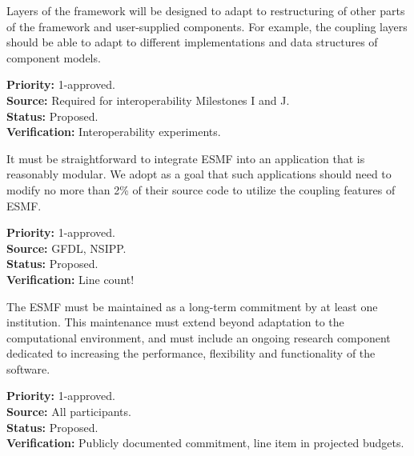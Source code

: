 Layers of the framework will be designed to adapt to restructuring of
other parts of the framework and user-supplied components.  For
example, the coupling layers should be able to adapt to different
implementations and data structures of component models.
\begin{reqlist}
{\bf Priority:} 1-approved. \\
{\bf Source:} Required for interoperability Milestones I and J. \\
{\bf Status:} Proposed. \\
{\bf Verification:} Interoperability experiments.
\end{reqlist}

It must be straightforward to integrate ESMF into an application 
that is reasonably modular.  We adopt as a goal that such applications should
need to modify no more than 2\% of their source code to utilize the coupling
features of ESMF.
\begin{reqlist}
{\bf Priority:} 1-approved. \\
{\bf Source:} GFDL, NSIPP. \\
{\bf Status:} Proposed. \\
{\bf Verification:} Line count!
\end{reqlist}

The ESMF must be maintained as a long-term commitment by at least one
institution.  This maintenance must extend beyond adaptation to the 
computational environment, and must include an ongoing research component
dedicated to increasing the performance, flexibility and functionality of
the software.
\begin{reqlist}
{\bf Priority:} 1-approved. \\
{\bf Source:} All participants. \\
{\bf Status:} Proposed. \\
{\bf Verification:} Publicly documented commitment, line item in 
projected budgets.
\end{reqlist}






